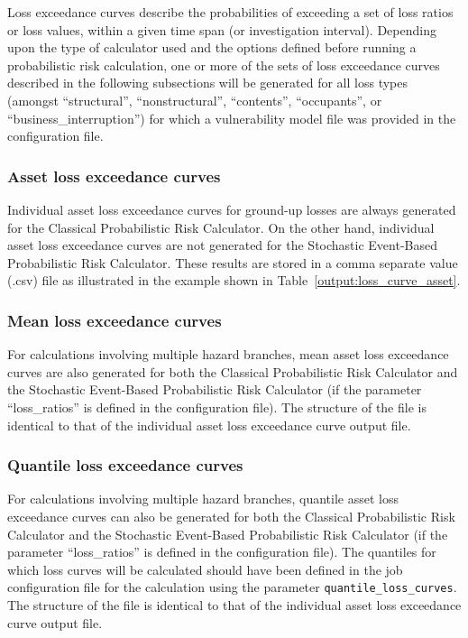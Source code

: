 Loss exceedance curves describe the probabilities of exceeding a set of loss
ratios or loss values, within a given time span (or investigation interval).
Depending upon the type of calculator used and the options defined before
running a probabilistic risk calculation, one or more of the sets of loss
exceedance curves described in the following subsections will be generated for
all loss types (amongst ``structural'', ``nonstructural'', ``contents'',
``occupants'', or ``business\_interruption'') for which a vulnerability model
file was provided in the configuration file.

\subsubsection{Asset loss exceedance curves}
\label{subsubsec:asset_loss_curves}

Individual asset loss exceedance curves for ground-up losses are always
generated for the Classical Probabilistic Risk Calculator. On the other hand,
individual asset loss exceedance curves are not generated for the Stochastic
Event-Based Probabilistic Risk Calculator. These results are stored in a comma
separate value (.csv) file as illustrated in the example shown in
Table~\ref{output:loss_curve_asset}.



\subsubsection{Mean loss exceedance curves}
\label{subsubsec:mean_loss_curves}

For calculations involving multiple hazard branches, mean asset loss
exceedance curves are also generated for both the Classical Probabilistic Risk
Calculator and the Stochastic Event-Based Probabilistic Risk Calculator (if
the parameter ``loss\_ratios'' is defined in the configuration file). The
structure of the file is identical to that of the individual asset loss
exceedance curve output file.

\subsubsection{Quantile loss exceedance curves}
\label{subsubsec:quantile_loss_curves}

For calculations involving multiple hazard branches, quantile asset loss
exceedance curves can also be generated for both the Classical Probabilistic
Risk Calculator and the Stochastic Event-Based Probabilistic Risk Calculator
(if the parameter ``loss\_ratios'' is defined in the configuration file). The
quantiles for which loss curves will be calculated should have been defined in
the job configuration file for the calculation using the parameter
\Verb+quantile_loss_curves+. The structure of the file is identical to that of
the individual asset loss exceedance curve output file.

